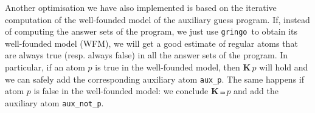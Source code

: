 \documentclass{new_tlp}
\newcommand{\textapprox}{\raisebox{0.5ex}{\texttildelow}}
\def\K{\mathbf{K}\, }
\def\gringo{{\tt gringo}}
\begin{document}
Another optimisation we have also implemented is based on the iterative computation of the well-founded model of the auxiliary guess program.
%
%
If, instead of computing the answer sets of the program, we just use \gringo\ to obtain its well-founded model (WFM), we will get a good estimate of regular atoms that are always true (resp. always false) in all the answer sets of the program.
In particular, if an atom $p$ is true in the well-founded model, then $\K p$ will hold and we can safely add the corresponding auxiliary atom {\tt aux\_p}.
The same happens if atom $p$ is false in the well-founded model: we conclude $\K \Not \, p$ and add the auxiliary atom {\tt aux\_not\_p}.
\end{document}
